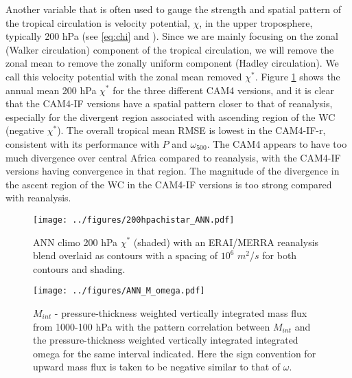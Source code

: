 \documentclass[letterpaper,12pt,titlepage,oneside,final]{book}
\begin{document}
Another variable that is often used to gauge the strength and spatial pattern of the tropical circulation is velocity potential, $\chi$, in the upper troposphere, typically 200 hPa (see \ref{eq:chi} and \cite{tanaka_trend_2004}). Since we are mainly focusing on the zonal (Walker circulation) component of the tropical circulation, we will remove the zonal mean to remove the zonally uniform component (Hadley circulation). We call this velocity potential with the zonal mean removed $\chi^{*}$. Figure \ref{fig:chistar} shows the annual mean 200 hPa $\chi^{*}$ for the three different CAM4 versions, and it is clear that the CAM4-IF versions have a spatial pattern closer to that of reanalysis, especially for the divergent region associated with ascending region of the WC (negative $\chi^{*}$). The overall tropical mean RMSE is lowest in the CAM4-IF-r, consistent with its performance with $P$ and $\omega_{500}$. The CAM4 appears to have too much divergence over central Africa compared to reanalysis, with the CAM4-IF versions having convergence in that region. The magnitude of the divergence in the ascent region of the WC in the CAM4-IF versions is too strong compared with reanalysis.
\begin{figure}[H]
\centering
\noindent\texttt{[image: ../figures/200hpachistar\_ANN.pdf]}\hfill
\caption{ANN climo 200 hPa $\chi^{*}$ (shaded) with an ERAI/MERRA reanalysis blend overlaid as contours with a spacing of $10^{6}$ $m^{2}$/$s$ for both contours and shading.}
\label{fig:chistar}
\end{figure}
\begin{figure}[H]
\centering
\noindent\texttt{[image: ../figures/ANN\_M\_omega.pdf]}\hfill
\caption{$M_{int}$ - pressure-thickness weighted vertically integrated mass flux from 1000-100 hPa with the pattern correlation between $M_{int}$ and the pressure-thickness weighted vertically integrated integrated omega for the same interval indicated. Here the sign convention for upward mass flux is taken to be negative similar to that of $\omega$.}
\label{fig:mcomeg}
\end{figure}
\end{document}
